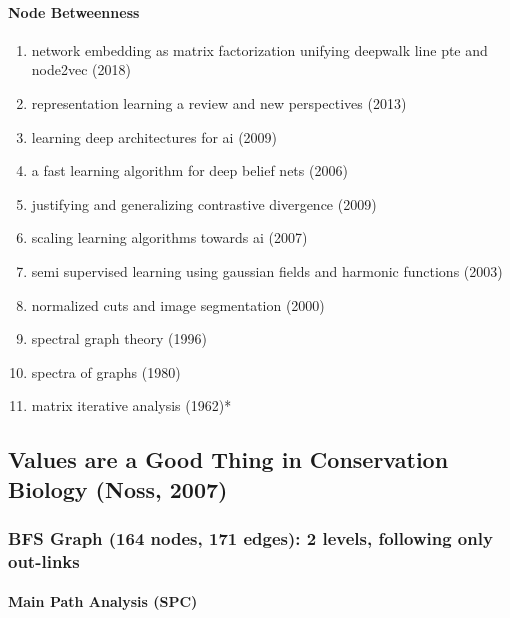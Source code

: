 \documentclass[lettepaper,]{article}
\providecommand{\tightlist}{%
  \setlength{\itemsep}{0pt}\setlength{\parskip}{0pt}}
\let\oldparagraph\paragraph
\renewcommand{\paragraph}[1]{\oldparagraph{#1}\mbox{}}
\begin{document}
\hypertarget{node-betweenness-3}{%
\paragraph{Node Betweenness}\label{node-betweenness-3}}

\begin{enumerate}
\def\labelenumi{\arabic{enumi}.}
\tightlist
\item
  network embedding as matrix factorization unifying deepwalk line pte
  and node2vec (2018)
\item
  representation learning a review and new perspectives (2013)
\item
  learning deep architectures for ai (2009)
\item
  a fast learning algorithm for deep belief nets (2006)
\item
  justifying and generalizing contrastive divergence (2009)
\item
  scaling learning algorithms towards ai (2007)
\item
  semi supervised learning using gaussian fields and harmonic functions
  (2003)
\item
  normalized cuts and image segmentation (2000)
\item
  spectral graph theory (1996)
\item
  spectra of graphs (1980)
\item
  matrix iterative analysis (1962)*
\end{enumerate}

\hypertarget{values-are-a-good-thing-in-conservation-biology-noss-2007}{%
\subsection{Values are a Good Thing in Conservation Biology (Noss,
2007)}\label{values-are-a-good-thing-in-conservation-biology-noss-2007}}

\hypertarget{bfs-graph-164-nodes-171-edges-2-levels-following-only-out-links}{%
\subsubsection{BFS Graph (164 nodes, 171 edges): 2 levels, following
only
out-links}\label{bfs-graph-164-nodes-171-edges-2-levels-following-only-out-links}}

\hypertarget{main-path-analysis-spc-4}{%
\paragraph{Main Path Analysis (SPC)}\label{main-path-analysis-spc-4}}
\end{document}
